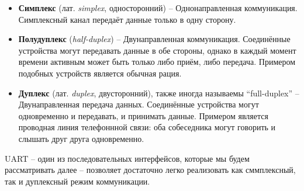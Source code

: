\documentclass[../sparc.tex]{subfiles}
\begin{document}
\begin{itemize}
\item \textbf{Симплекс} (лат. \emph{simplex}, односторонний) -- Однонаправленная
  коммуникация.  Симплексный канал передаёт данные только в одну сторону.
\item \textbf{Полудуплекс} (\emph{half-duplex}) -- Двунаправленная коммуникация.
  Соединённые устройства могут передавать данные в обе стороны, однако в каждый
  момент времени активным может быть только либо приём, либо передача.  Примером
  подобных устройств является обычная рация.
\item \textbf{Дуплекс} (лат. \emph{duplex}, двусторонний), также иногда
  называемы ``full-duplex'' -- Двунаправленная передача данных.  Соединённые
  устройства могут одновременно и передавать, и принимать данные.  Примером
  является проводная линия телефоннной связи: оба собеседника могут говорить и
  слышать друг друга одновременно.
\end{itemize}

\gls{UART} -- один из последовательных интерфейсов, которые мы будем
рассматривать далее -- позволяет достаточно легко реализовать как сммплексный,
так и дуплексный режим коммуникации.
\end{document}
